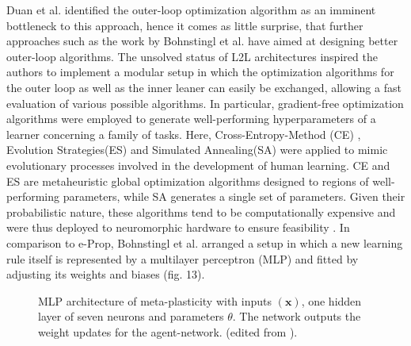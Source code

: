 \documentclass[letterpaper, 10 pt, conference]{ieeeconf}  %
\begin{document}
Duan et al.\cite{duanOneShotImitationLearning2017} identified the outer-loop optimization algorithm as an imminent 
bottleneck to this approach, hence it comes as 
little surprise, that further approaches such as the work by Bohnstingl et al.\cite{bohnstinglNeuromorphicHardwareLearns2019}
 have aimed at designing better outer-loop algorithms.
The unsolved status of L2L architectures inspired the authors to implement a modular setup in which the optimization algorithms
for the outer loop as well as the inner leaner can easily be exchanged, allowing a fast evaluation of various possible algorithms. In 
particular, gradient-free optimization algorithms were employed to generate well-performing hyperparameters of a learner concerning a 
family of tasks. Here, Cross-Entropy-Method (CE) \cite{botevCrossEntropyMethodOptimization2013}, Evolution Strategies(ES)
\cite{beyerEvolutionStrategiesComprehensive2002} and Simulated Annealing(SA)\cite{kirkpatrickOptimizationSimulatedAnnealing1983}
were applied to mimic evolutionary 
processes involved in the development of human learning. CE and ES are metaheuristic global optimization algorithms designed to regions of 
well-performing parameters, while SA generates a single set of parameters. Given their probabilistic nature, these algorithms tend to be 
computationally expensive and were thus deployed to neuromorphic hardware to ensure feasibility \cite{bohnstinglNeuromorphicHardwareLearns2019}.
In comparison to e-Prop, 
Bohnstingl et al. arranged a setup in which a new learning rule itself is represented by a multilayer perceptron (MLP) and fitted by 
adjusting its weights and biases (fig. 13). 

\begin{figure}[thpb]
        \centering
  \caption{ MLP architecture of meta-plasticity with inputs $\mathbf{(x)}$, one hidden layer of seven neurons and parameters $\theta$. 
  The network outputs the weight updates for the agent-network.
  (edited from \cite{bohnstinglNeuromorphicHardwareLearns2019}).
  }
        \label{figurelabel}
     \end{figure}
\end{document}
